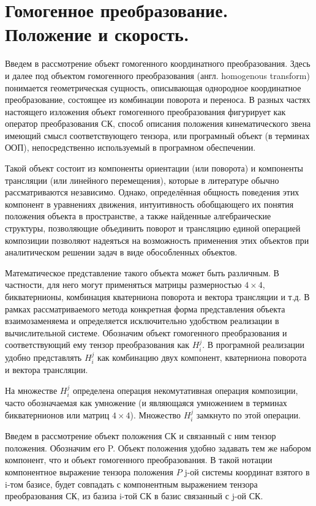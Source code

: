 \section{Гомогенное преобразование. Положение и скорость.}\label{geom}

Введем в рассмотрение объект гомогенного координатного преобразования. Здесь и далее под объектом гомогенного преобразования (англ. homogenous transform) понимается геометрическая сущность, описывающая однородное координатное преобразование, состоящее из комбинации поворота и переноса. В разных частях настоящего изложения объект гомогенного преобразования фигурирует как оператор преобразования СК, способ описания положения кинематического звена имеющий смысл соответствующего тензора, или програмный объект (в терминах ООП), непосредственно используемый в програмном обеспечении. 

Такой объект состоит из компоненты ориентации (или поворота) и компоненты трансляции (или линейного перемещения), которые в литературе обычно рассматриваются независимо. Однако, определённая общность поведения этих компонент в уравнениях движения, интуитивность обобщающего их понятия положения объекта в пространстве, а также найденные алгебраические структуры, позволяющие объединить поворот и трансляцию единой операцией композиции позволяют надеяться на возможность применения этих объектов при аналитическом решении задач в виде обособленных объектов.   

Математическое представление такого объекта может быть различным. В частности, для него могут применяться матрицы размерностью $4\times4$, бикватернионы, комбинация кватерниона поворота и вектора трансляции и т.д. В рамках рассматриваемого метода конкретная форма представления объекта взаимозаменяема и определяется исключительно удобством реализации в вычислительной системе. Обозначим объект гомогенного преобразования и соответствующий ему тензор преобразования как $H^j_i$. В програмной реализации удобно представлять $H^j_i$ как комбинацию двух компонент, кватерниона поворота и вектора трансляции.

На множестве $H^j_i$ определена операция некомутативная операция композиции, часто обозначаемая как умножение (и являющаяся умножением в терминах бикватернионов или матриц $4\times4$). Множество $H^j_i$ замкнуто по этой операции.

Введем в рассмотрение объект положения СК и связанный с ним тензор положения. Обозначим его P. Объект положения удобно задавать тем же набором компонент, что и объект гомогенного преобразования. В такой нотации компонентное выражение тензора положения $P$ j-ой системы координат взятого в i-том базисе, будет совпадать с компонентным выражением тензора преобразования СК, из базиза i-той СК в базис связанный с j-ой СК. 

